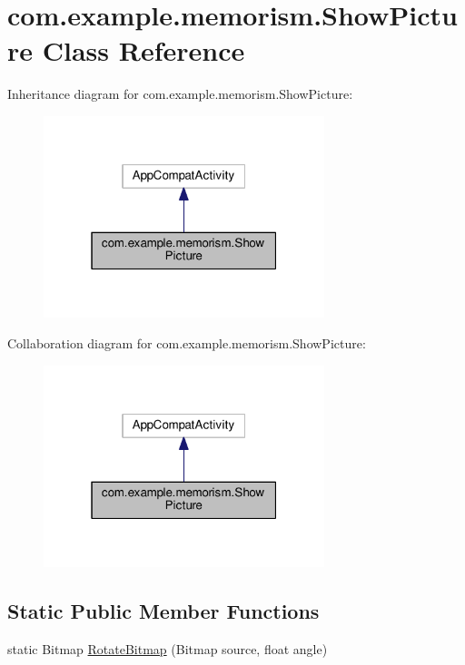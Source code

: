 \hypertarget{classcom_1_1example_1_1memorism_1_1_show_picture}{}\section{com.\+example.\+memorism.\+Show\+Picture Class Reference}
\label{classcom_1_1example_1_1memorism_1_1_show_picture}


Inheritance diagram for com.\+example.\+memorism.\+Show\+Picture\+:
\nopagebreak
\begin{figure}[H]
\begin{center}
\leavevmode
\includegraphics[width=232pt]{de/dc0/classcom_1_1example_1_1memorism_1_1_show_picture__inherit__graph}
\end{center}
\end{figure}


Collaboration diagram for com.\+example.\+memorism.\+Show\+Picture\+:
\nopagebreak
\begin{figure}[H]
\begin{center}
\leavevmode
\includegraphics[width=232pt]{d2/d9f/classcom_1_1example_1_1memorism_1_1_show_picture__coll__graph}
\end{center}
\end{figure}
\subsection*{Static Public Member Functions}
\begin{DoxyCompactItemize}
\item 
static Bitmap \hyperlink{classcom_1_1example_1_1memorism_1_1_show_picture_abcf63f664625879f223f6decad593f16}{Rotate\+Bitmap} (Bitmap source, float angle)
\end{DoxyCompactItemize}
